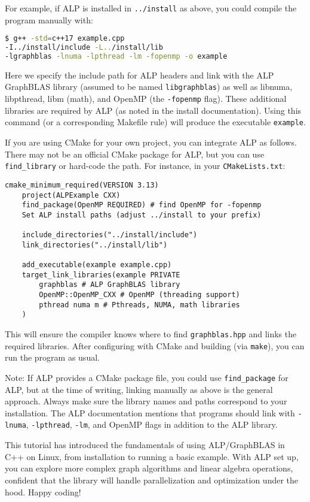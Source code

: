 For example, if ALP is installed in \texttt{../install} as above, you could compile the program manually with:
\begin{lstlisting}[language=bash]
$ g++ -std=c++17 example.cpp
-I../install/include -L../install/lib
-lgraphblas -lnuma -lpthread -lm -fopenmp -o example
\end{lstlisting}
Here we specify the include path for ALP headers and link with the ALP GraphBLAS library (assumed to be named \texttt{libgraphblas}) as well as libnuma, libpthread, libm (math), and OpenMP (the \texttt{-fopenmp} flag). These additional libraries are required by ALP (as noted in the install documentation). Using this command (or a corresponding Makefile rule) will produce the executable \texttt{example}.

If you are using CMake for your own project, you can integrate ALP as follows. There may not be an official CMake package for ALP, but you can use \texttt{find\_library} or hard-code the path. For instance, in your \texttt{CMakeLists.txt}:

\begin{lstlisting}[caption={Example CMakeLists.txt for an ALP project}]
    cmake_minimum_required(VERSION 3.13)
    project(ALPExample CXX)
    find_package(OpenMP REQUIRED) # find OpenMP for -fopenmp
    Set ALP install paths (adjust ../install to your prefix)
    
    include_directories("../install/include")
    link_directories("../install/lib")
    
    add_executable(example example.cpp)
    target_link_libraries(example PRIVATE
        graphblas # ALP GraphBLAS library
        OpenMP::OpenMP_CXX # OpenMP (threading support)
        pthread numa m # Pthreads, NUMA, math libraries
    )
\end{lstlisting}

This will ensure the compiler knows where to find \texttt{graphblas.hpp} and links the required libraries. After configuring with CMake and building (via \texttt{make}), you can run the program as usual.

\vspace{1ex}

Note: If ALP provides a CMake package file, you could use \texttt{find\_package} for ALP, but at the time of writing, linking manually as above is the general approach. Always make sure the library names and paths correspond to your installation. The ALP documentation mentions that programs should link with \texttt{-lnuma}, \texttt{-lpthread}, \texttt{-lm}, and OpenMP flags in addition to the ALP library.

\bigskip

This tutorial has introduced the fundamentals of using ALP/GraphBLAS in C++ on Linux, from installation to running a basic example. With ALP set up, you can explore more complex graph algorithms and linear algebra operations, confident that the library will handle parallelization and optimization under the hood. Happy coding!
